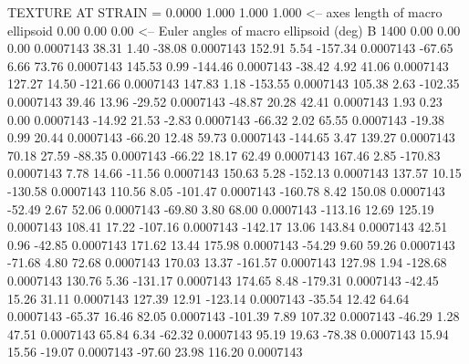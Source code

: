 TEXTURE AT STRAIN =    0.0000
   1.000   1.000   1.000  <-- axes length of macro ellipsoid
    0.00    0.00    0.00  <-- Euler angles of macro ellipsoid (deg)
B      1400
        0.00        0.00        0.00     0.0007143
       38.31        1.40      -38.08     0.0007143
      152.91        5.54     -157.34     0.0007143
      -67.65        6.66       73.76     0.0007143
      145.53        0.99     -144.46     0.0007143
      -38.42        4.92       41.06     0.0007143
      127.27       14.50     -121.66     0.0007143
      147.83        1.18     -153.55     0.0007143
      105.38        2.63     -102.35     0.0007143
       39.46       13.96      -29.52     0.0007143
      -48.87       20.28       42.41     0.0007143
        1.93        0.23        0.00     0.0007143
      -14.92       21.53       -2.83     0.0007143
      -66.32        2.02       65.55     0.0007143
      -19.38        0.99       20.44     0.0007143
      -66.20       12.48       59.73     0.0007143
     -144.65        3.47      139.27     0.0007143
       70.18       27.59      -88.35     0.0007143
      -66.22       18.17       62.49     0.0007143
      167.46        2.85     -170.83     0.0007143
        7.78       14.66      -11.56     0.0007143
      150.63        5.28     -152.13     0.0007143
      137.57       10.15     -130.58     0.0007143
      110.56        8.05     -101.47     0.0007143
     -160.78        8.42      150.08     0.0007143
      -52.49        2.67       52.06     0.0007143
      -69.80        3.80       68.00     0.0007143
     -113.16       12.69      125.19     0.0007143
      108.41       17.22     -107.16     0.0007143
     -142.17       13.06      143.84     0.0007143
       42.51        0.96      -42.85     0.0007143
      171.62       13.44      175.98     0.0007143
      -54.29        9.60       59.26     0.0007143
      -71.68        4.80       72.68     0.0007143
      170.03       13.37     -161.57     0.0007143
      127.98        1.94     -128.68     0.0007143
      130.76        5.36     -131.17     0.0007143
      174.65        8.48     -179.31     0.0007143
      -42.45       15.26       31.11     0.0007143
      127.39       12.91     -123.14     0.0007143
      -35.54       12.42       64.64     0.0007143
      -65.37       16.46       82.05     0.0007143
     -101.39        7.89      107.32     0.0007143
      -46.29        1.28       47.51     0.0007143
       65.84        6.34      -62.32     0.0007143
       95.19       19.63      -78.38     0.0007143
       15.94       15.56      -19.07     0.0007143
      -97.60       23.98      116.20     0.0007143

